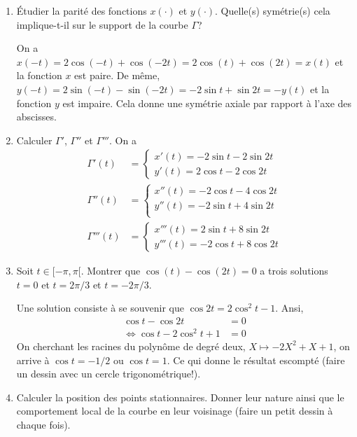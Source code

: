 \documentclass[a4paper]{tp_um}
\begin{document}
	\begin{enumerate}
		\item \'Etudier la parité des fonctions $x(\cdot)$ et $y(\cdot)$. Quelle(s) symétrie(s) cela implique-t-il sur le support de la courbe $\Gamma$?

			\bigskip

On a $x(-t) = 2\cos(- t) + \cos (-2t) = 2\cos(t) + \cos (2t) = x(t)$ et la fonction $x$ est paire. De même, $y(-t) =  2\sin (-t) - \sin (-2t)= -2\sin t + \sin 2t = -y(t)$ et la fonction $y$ est impaire. Cela donne une symétrie axiale par rapport à l'axe des abscisses.   	\bigskip


		\item Calculer $\Gamma'$, $\Gamma''$ et $\Gamma'''$.
	\bigskip
On a 
\begin{align*}
		\Gamma'(t) & = 
	\begin{cases}
	x'(t) = -2\sin t - 2 \sin 2t \\
	y'(t) = 2\cos t - 2 \cos 2t
	\end{cases} \\
		\Gamma''(t) & = 
	\begin{cases}
	x''(t) = -2\cos t - 4 \cos 2t\\
	y''(t) = -2\sin t + 4 \sin 2t \\
	\end{cases}\\
		\Gamma'''(t) & = 
	\begin{cases}
x'''(t) = 	2\sin t + 8 \sin 2t \\
y'''(t) = 	-2\cos t +8 \cos 2t
	\end{cases}
\end{align*}



\item Soit $t \in [-\pi,\pi[$. Montrer que $\cos(t) - \cos(2t) = 0$ a trois solutions $t = 0$ et $t=2\pi/3$ et $t= -2\pi/3$. 

			\bigskip
Une solution consiste à se souvenir que $\cos 2t = 2\cos^2 t -1$. Ansi,
\begin{align*}
	\cos t - \cos 2t &= 0 \\
\Leftrightarrow \cos t - 2\cos^2 t +1 &= 0
\end{align*}
On cherchant les racines du polynôme de degré deux, $X \mapsto -2X^2+X+1$, on arrive à  $\cos t = -1/2$ ou $\cos t = 1$. Ce qui donne le résultat escompté (faire un dessin avec un cercle trigonométrique!).

			\bigskip
	\item Calculer la position des points stationnaires. Donner leur nature ainsi que le comportement local de la courbe en leur voisinage (faire un petit dessin à chaque fois).


\end{enumerate}
\end{document}
